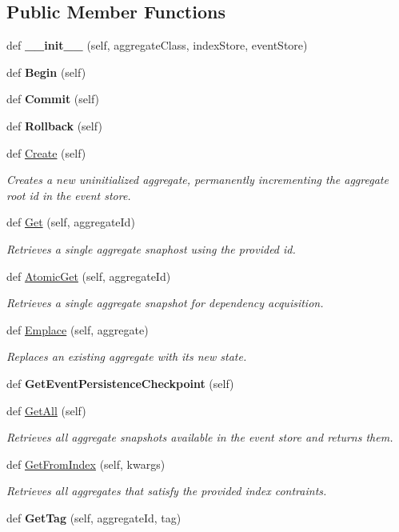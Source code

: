 \subsection*{Public Member Functions}
\begin{DoxyCompactItemize}
\item 
def {\bfseries \+\_\+\+\_\+init\+\_\+\+\_\+} (self, aggregate\+Class, index\+Store, event\+Store)
\item 
def {\bfseries Begin} (self)
\item 
def {\bfseries Commit} (self)
\item 
def {\bfseries Rollback} (self)
\item 
def \hyperlink{group__Chronos_ga631476634e37f9961dba1bb160bb9ee5}{Create} (self)
\begin{DoxyCompactList}\small\item\em Creates a new uninitialized aggregate, permanently incrementing the aggregate root id in the event store. \end{DoxyCompactList}\item 
def \hyperlink{group__Chronos_ga8b9bae0731e091c9f2a79803149f5449}{Get} (self, aggregate\+Id)
\begin{DoxyCompactList}\small\item\em Retrieves a single aggregate snaphost using the provided id. \end{DoxyCompactList}\item 
def \hyperlink{group__Chronos_ga21a75e7e033c6cf88ac47d6525f8c991}{Atomic\+Get} (self, aggregate\+Id)
\begin{DoxyCompactList}\small\item\em Retrieves a single aggregate snapshot for dependency acquisition. \end{DoxyCompactList}\item 
def \hyperlink{group__Chronos_ga5034ab423a49b011e6f90460ddd4e70e}{Emplace} (self, aggregate)
\begin{DoxyCompactList}\small\item\em Replaces an existing aggregate with its new state. \end{DoxyCompactList}\item 
def {\bfseries Get\+Event\+Persistence\+Checkpoint} (self)
\item 
def \hyperlink{group__Chronos_gac9cde7c90df6d8e1d0c0166cfa87358c}{Get\+All} (self)
\begin{DoxyCompactList}\small\item\em Retrieves all aggregate snapshots available in the event store and returns them. \end{DoxyCompactList}\item 
def \hyperlink{group__Chronos_ga4abb70024e82d3dca4f92c634bdc4bfd}{Get\+From\+Index} (self, kwargs)
\begin{DoxyCompactList}\small\item\em Retrieves all aggregates that satisfy the provided index contraints. \end{DoxyCompactList}\item 
def {\bfseries Get\+Tag} (self, aggregate\+Id, tag)
\end{DoxyCompactItemize}
